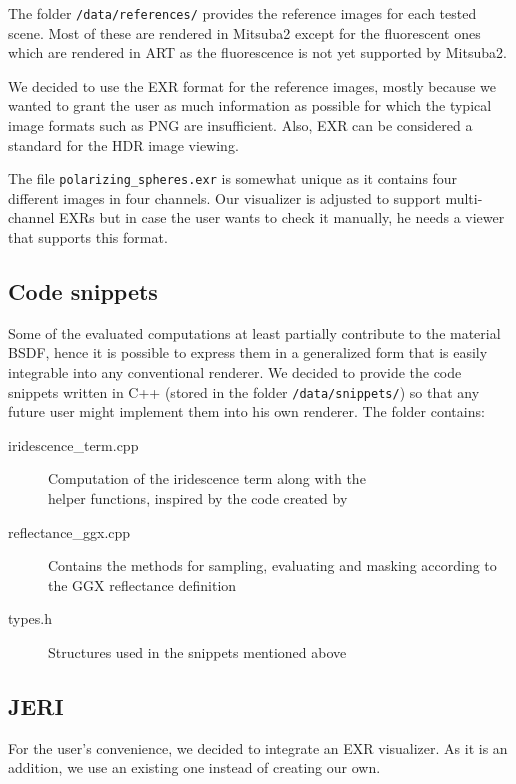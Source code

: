 The folder \texttt{/data/references/} provides the reference images for each tested scene. Most of these are rendered in Mitsuba2 except for the fluorescent ones which are rendered in ART as the fluorescence is not yet supported by Mitsuba2.

We decided to use the EXR format for the reference images, mostly because we wanted to grant the user as much information as possible for which the typical image formats such as PNG are insufficient. Also, EXR can be considered a standard for the HDR image viewing.

The file \texttt{polarizing\_spheres.exr} is somewhat unique as it contains four different images in four channels. Our visualizer is adjusted to support multi-channel EXRs but in case the user wants to check it manually, he needs a viewer that supports this format.

\subsection{Code snippets}

Some of the evaluated computations at least partially contribute to the material BSDF, hence it is possible to express them in a generalized form that is easily integrable into any conventional renderer. We decided to provide the code snippets written in C++ (stored in the folder \texttt{/data/snippets/}) so that any future user might implement them into his own renderer. The folder contains:

\begin{description}
	\item[iridescence\_term.cpp] Computation of the iridescence term along with the \\helper functions, inspired by the code created by \citet{belcour2017practical}
	\item[reflectance\_ggx.cpp] Contains the methods for sampling, evaluating and masking according to the GGX reflectance definition~\cite{walter2007microfacet}
	\item[types.h] Structures used in the snippets mentioned above 
\end{description}

\subsection{JERI}
\label{sec:jeri}

For the user's convenience, we decided to integrate an EXR visualizer. As it is an addition, we use an existing one instead of creating our own.

